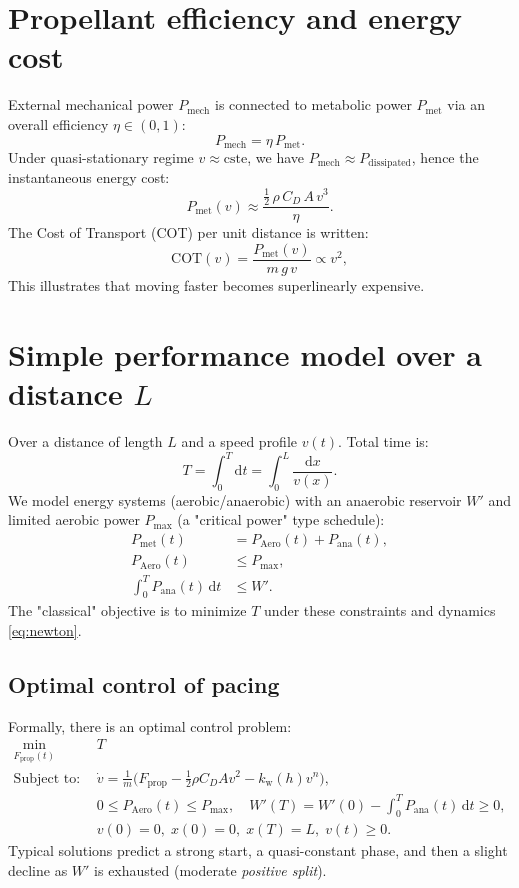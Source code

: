 \documentclass[12pt,a4paper]{article}
\newcommand{\dd}{\mathrm{d}}
\begin{document}
\section{Propellant efficiency and energy cost}
External mechanical power $P_{\mathrm{mech}}$ is connected to metabolic power $P_{\mathrm{met}}$ via an overall efficiency $\eta\in(0,1)$:
\begin{equation}
 P_{\mathrm{mech}} = \eta\, P_{\mathrm{met}}.
 \end{equation}
Under quasi-stationary regime $v\approx\text{cste}$, we have $P_{\mathrm{mech}}\approx P_{\mathrm{dissipated}}$, hence the instantaneous energy cost:
\begin{equation}
 P_{\mathrm{met}}(v) \approx \frac{\tfrac{1}{2}\,\rho\,C_D\,A\,v^3}{\eta}.
 \end{equation}
The Cost of Transport (COT) per unit distance is written:
\begin{equation}
 \mathrm{COT}(v) = \frac{P_{\mathrm{met}}(v)}{m\,g\,v} \propto v^2, 
 \end{equation}
This illustrates that moving faster becomes superlinearly expensive.

\section{Simple performance model over a distance $L$}
Over a distance of length $L$ and a speed profile $v(t)$. Total time is:
\begin{equation}
 T = \int_0^{T} \dd t = \int_0^{L} \frac{\dd x}{v(x)}.
 \end{equation}
We model energy systems (aerobic/anaerobic) with an anaerobic reservoir $W'$ and limited aerobic power $P_{\max}$ (a "critical power" type schedule):
\begin{align}
 P_{\mathrm{met}}(t) &= P_{\mathrm{Aero}}(t) + P_{\mathrm{ana}}(t), \\
 P_{\mathrm{Aero}}(t) &\le P_{\max}, \\
 \int_0^T P_{\mathrm{ana}}(t)\,\dd t &\le W'.
 \end{align}
The "classical" objective is to minimize $T$ under these constraints and dynamics \eqref{eq:newton}.

\subsection{Optimal control of pacing}
Formally, there is an optimal control problem:
\begin{align}
 \min_{F_{\mathrm{prop}}(t)}\; &T \\
 \text{Subject to: }\; &\dot v = \frac{1}{m}\Big(F_{\mathrm{prop}} - \tfrac{1}{2}\rho C_D A v^2 - k_\mathrm{w}(h)v^n\Big), \\
 &0\le P_{\mathrm{Aero}}(t)\le P_{\max},\quad W'(T)=W'(0)-\int_0^T P_{\mathrm{ana}}(t)\,\dd t\ge 0, \\
 &v(0)=0,\; x(0)=0,\; x(T)=L,\; v(t)\ge 0.
 \end{align}
Typical solutions predict a strong start, a quasi-constant phase, and then a slight decline as $W'$ is exhausted (moderate \emph{positive split}).
\end{document}
